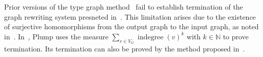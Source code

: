 Prior versions of the type graph method~\cite{bruggink2014termination,bruggink2015proving,endrullis2023generalized} fail to establish termination of the graph rewriting system presneted in~. This limitation arises due to the existence of surjective homomorphisms from the output graph to the input graph, as noted in~\cite{endrullis2023generalized}. In~\cite{plump2018modular}, Plump uses the measure $\sum_{v\in V_G} \operatorname{indegree}(v)^k$ with $k \mathop{\in} \mathbb{N}$ to prove termination. Its termination can also be proved by the method proposed in~\cite{overbeek2023termination}.

